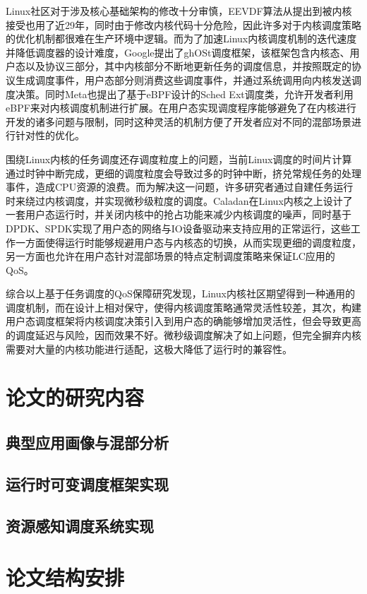 Linux社区对于涉及核心基础架构的修改十分审慎，EEVDF算法从提出到被内核接受也用了近29年，同时由于修改内核代码十分危险，因此许多对于内核调度策略的优化机制都很难在生产环境中逻辑。而为了加速Linux内核调度机制的迭代速度并降低调度器的设计难度，Google提出了ghOSt\citep{humphries2021ghost}调度框架，该框架包含内核态、用户态以及协议三部分，其中内核部分不断地更新任务的调度信息，并按照既定的协议生成调度事件，用户态部分则消费这些调度事件，并通过系统调用向内核发送调度决策。同时Meta也提出了基于eBPF设计的Sched Ext调度类，允许开发者利用eBPF来对内核调度机制进行扩展。在用户态实现调度程序能够避免了在内核进行开发的诸多问题与限制，同时这种灵活的机制方便了开发者应对不同的混部场景进行针对性的优化。

围绕Linux内核的任务调度还存调度粒度上的问题，当前Linux调度的时间片计算通过时钟中断完成，更细的调度粒度会导致过多的时钟中断，挤兑常规任务的处理事件，造成CPU资源的浪费。而为解决这一问题，许多研究者通过自建任务运行时来绕过内核调度，并实现微秒级粒度的调度\citep{yang2016elfen,ousterhout2019shenango,fried2020caladan,prekas2017zygos}。Caladan\citep{fried2020caladan}在Linux内核之上设计了一套用户态运行时，并关闭内核中的抢占功能来减少内核调度的噪声，同时基于DPDK、SPDK实现了用户态的网络与IO设备驱动来支持应用的正常运行，这些工作一方面使得运行时能够规避用户态与内核态的切换，从而实现更细的调度粒度，另一方面也允许在用户态针对混部场景的特点定制调度策略来保证LC应用的QoS。

综合以上基于任务调度的QoS保障研究发现，Linux内核社区期望得到一种通用的调度机制，而在设计上相对保守，使得内核调度策略通常灵活性较差，其次，构建用户态调度框架将内核调度决策引入到用户态的确能够增加灵活性，但会导致更高的调度延迟与风险，因而效果不好。微秒级调度解决了如上问题，但完全摒弃内核需要对大量的内核功能进行适配，这极大降低了运行时的兼容性。

\section{论文的研究内容}



\subsection{典型应用画像与混部分析}

\subsection{运行时可变调度框架实现}

\subsection{资源感知调度系统实现}

\section{论文结构安排}
